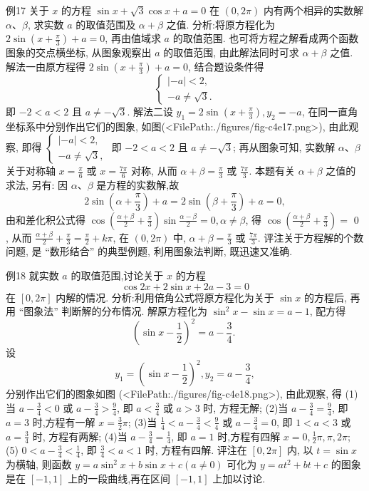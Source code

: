 例17 关于 $x$ 的方程 $\sin x+\sqrt{3} \cos x+a=0$ 在 $(0,2 \pi)$ 内有两个相异的实数解 $\alpha 、 \beta$, 求实数 $a$ 的取值范围及 $\alpha+\beta$ 之值.
分析:将原方程化为 $2 \sin \left(x+\frac{\pi}{3}\right)+a=0$, 再由值域求 $a$ 的取值范围.
也可将方程之解看成两个函数图象的交点横坐标, 从图象观察出 $a$ 的取值范围, 由此解法同时可求 $\alpha+\beta$ 之值.
解法一由原方程得 $2 \sin \left(x+\frac{\pi}{3}\right)+a=0$, 结合题设条件得
$$
\left\{\begin{array}{l}
|-a|<2, \\
-a \neq \sqrt{3} .
\end{array}\right.
$$
即 $-2<a<2$ 且 $a \neq-\sqrt{3}$.
解法二设 $y_1=2 \sin \left(x+\frac{\pi}{3}\right), y_2=-a$, 在同一直角坐标系中分别作出它们的图象, 如图(<FilePath:./figures/fig-c4e17.png>), 由此观察, 即得 $\left\{\begin{array}{l}|-a|<2, \\ -a \neq \sqrt{3},\end{array}\right.$ 即 $-2<a<2$ 且 $a \neq-\sqrt{3}$;
再从图象可知, 实数解 $\alpha 、 \beta$ 关于对称轴 $x= \frac{\pi}{6}$ 或 $x=\frac{7 \pi}{6}$ 对称, 从而 $\alpha+\beta=\frac{\pi}{3}$ 或 $\frac{7 \pi}{3}$.
本题有关 $\alpha+\beta$ 之值的求法, 另有:
因 $\alpha 、 \beta$ 是方程的实数解,故
$$
2 \sin \left(\alpha+\frac{\pi}{3}\right)+a=2 \sin \left(\beta+\frac{\pi}{3}\right)+a=0,
$$
由和差化积公式得 $\cos \left(\frac{\alpha+\beta}{2}+\frac{\pi}{3}\right) \sin \frac{\alpha-\beta}{2}=0, \alpha \neq \beta$, 得 $\cos \left(\frac{\alpha+\beta}{2}+\frac{\pi}{3}\right)=$ 0 , 从而 $\frac{\alpha+\beta}{2}+\frac{\pi}{3}=\frac{\pi}{2}+k \pi$, 在 $(0,2 \pi)$ 中, $\alpha+\beta=\frac{\pi}{3}$ 或 $\frac{7 \pi}{3}$.
评注关于方程解的个数问题, 是 “数形结合” 的典型例题, 利用图象法判断, 既迅速又准确.



例18 就实数 $a$ 的取值范围,讨论关于 $x$ 的方程
$$
\cos 2 x+2 \sin x+2 a-3=0
$$
在 $[0,2 \pi]$ 内解的情况.
分析:利用倍角公式将原方程化为关于 $\sin x$ 的方程后, 再用 “图象法” 判断解的分布情况.
解原方程化为 $\sin ^2 x-\sin x=a-1$, 配方得
$$
\left(\sin x-\frac{1}{2}\right)^2=a-\frac{3}{4} \text {. }
$$
设
$$
y_1=\left(\sin x-\frac{1}{2}\right)^2, y_2=a-\frac{3}{4},
$$
分别作出它们的图象如图 (<FilePath:./figures/fig-c4e18.png>), 由此观察, 得
(1)当 $a-\frac{3}{4}<0$ 或 $a-\frac{3}{4}>\frac{9}{4}$,
即 $a<\frac{3}{4}$ 或 $a>3$ 时, 方程无解;
(2)当 $a-\frac{3}{4}=\frac{9}{4}$, 即 $a=3$ 时,方程有一解 $x=\frac{3}{2} \pi$;
(3)当 $\frac{1}{4}<a-\frac{3}{4}<\frac{9}{4}$ 或 $a- \frac{3}{4}=0$, 即 $1<a<3$ 或 $a=\frac{3}{4}$ 时, 方程有两解;
(4)当 $a-\frac{3}{4}=\frac{1}{4}$, 即 $a=1$ 时,方程有四解 $x=0, \frac{1}{2} \pi, \pi, 2 \pi$;
(5) $0<a-\frac{3}{4}<\frac{1}{4}$, 即 $\frac{3}{4}<a<1$ 时, 方程有四解.
评注在 $[0,2 \pi]$ 内, 以 $t=\sin x$ 为横轴, 则函数 $y=a \sin ^2 x+b \sin x+c (a \neq 0)$ 可化为 $y=a t^2+b t+c$ 的图象是在 $[-1,1]$ 上的一段曲线,再在区间 $[-1,1]$ 上加以讨论.



